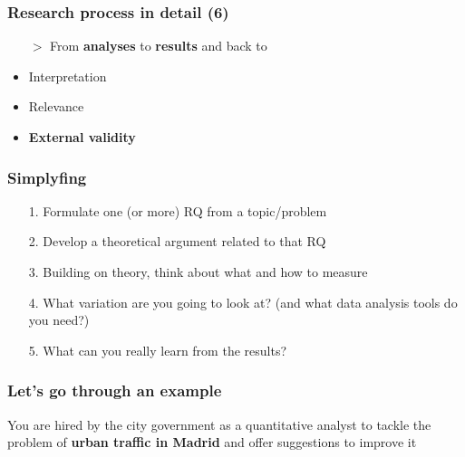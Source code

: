 \documentclass[aspectratio=43]{beamer}
\begin{document}
\begin{frame}
\frametitle{Research process in detail (6)}
\centering

\begin{itemize}
  \item[$>$] From \textbf{analyses} to \textbf{results} and back to 
  \item[]
  \item Interpretation
  \item Relevance
  \item \textbf{External validity}
\end{itemize}

\end{frame}

\begin{frame}
\frametitle{Simplyfing}
\centering

\begin{itemize}
  \item[1.] Formulate one (or more) RQ from a topic/problem
  \item[2.] Develop a theoretical argument related to that RQ
  \item[3.] Building on theory, think about what and how to measure
  \item[4.] What variation are you going to look at? (and what data analysis tools do you need?)
  \item[5.] What can you really learn from the results?
\end{itemize}

\end{frame}

\begin{frame}
\frametitle{Let's go through an example}
\centering

You are hired by the city government as a quantitative analyst to tackle the problem of \textbf{urban traffic in Madrid} and offer suggestions to improve it

\end{frame}
\end{document}
